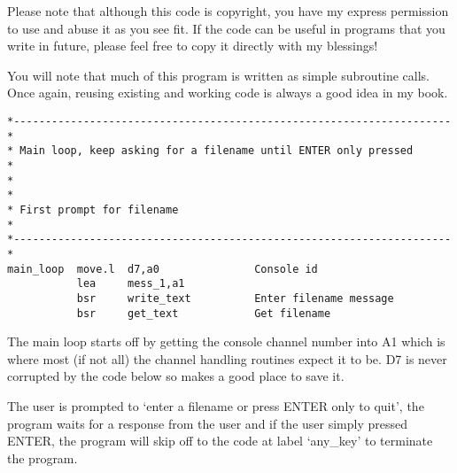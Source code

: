 Please note that although this code is copyright, you have my
    express permission to use and abuse it as you see fit. If the code can be
    useful in programs that you write in future, please feel free to copy it
    directly with my blessings!

You will note that much of this program is written as simple
    subroutine calls. Once again, reusing existing and working code is always
    a good idea in my book.

\begin{lstlisting}[firstnumber=last,caption={Dataspace Program - Part 2 - Get Filename}]
*---------------------------------------------------------------------*
* Main loop, keep asking for a filename until ENTER only pressed      *
*                                                                     *
* First prompt for filename                                           *
*---------------------------------------------------------------------*
main_loop  move.l  d7,a0               Console id
           lea     mess_1,a1
           bsr     write_text          Enter filename message
           bsr     get_text            Get filename
\end{lstlisting}

The main loop starts off by getting the console channel number into
    A1 which is where most (if not all) the channel handling routines expect
    it to be. D7 is never corrupted by the code below so makes a good place to
    save it.

The user is prompted to `enter a filename or press ENTER only to
    quit', the program waits for a response from the user and if the user
    simply pressed ENTER, the program will skip off to the code at label
    `any\_key' to terminate the program.

